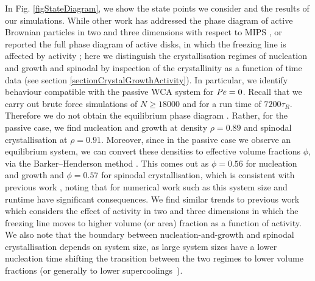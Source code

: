 In Fig. \ref{figStateDiagram}, we show the state points we consider and the results of our simulations. 
While other work has addressed the phase diagram of active Brownian particles in two and three dimensions with respect to MIPS \cite{richard2018,siebert2017}, or reported the full phase diagram of active disks, in which the freezing line is affected by activity \cite{digregorio2018};
here we distinguish the crystallisation regimes of nucleation and growth and spinodal by inspection of the crystallinity as a function of time data (see section \ref{sectionCrystalGrowthActivity}).
In particular, we identify behaviour compatible with the passive WCA system for $\operatorname{\mathit{P\kern-.08em e}}=0$. Recall that we carry out brute force simulations of $N\geq18000$ and for a run time of $7200\tau_R$. Therefore we do not obtain the equilibrium phase diagram \cite{kawasaki2010,filion2011}. Rather, for the passive case, we find nucleation and growth at density $\rho=0.89$ and spinodal crystallisation at $\rho=0.91$.
Moreover, since in the passive case we observe an equilibrium system, we can convert these densities to effective volume fractions $\phi$, via the Barker--Henderson method \cite{barker1967}. This comes out as $\phi=0.56$ for nucleation and growth and $\phi=0.57$ for spinodal crystallisation, which is consistent with previous work \cite{taffs2013,zaccarelli2009,valeriani2012,sanz2014,yanagishima2017}, noting that for numerical work such as this system size and runtime have significant consequences. We find similar trends to previous work which considers the effect of activity in two \cite{bialke2012,digregorio2018} and three dimensions \cite{wysocki2014,stenhammar2014,omar2021a,turci2021} in which the freezing line moves to higher volume (or area) fraction as a function of activity.
We also note that the boundary between nucleation-and-growth and spinodal crystallisation depends on system size, as large system sizes have a lower nucleation time shifting the transition between the two regimes to lower volume fractions (or generally to lower supercoolings~\cite{espinosa2016}).




